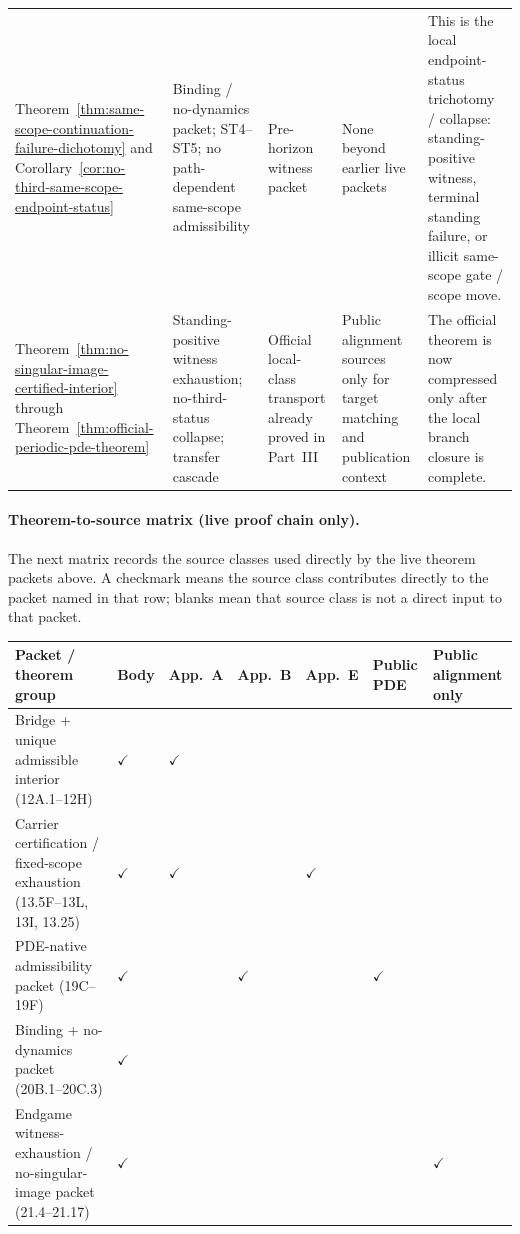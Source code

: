 \begin{center}
\begin{tabularx}{0.98\textwidth}{@{}L{0.22\textwidth}L{0.17\textwidth}L{0.17\textwidth}L{0.16\textwidth}Y@{}}
Theorem~\ref{thm:same-scope-continuation-failure-dichotomy} and Corollary~\ref{cor:no-third-same-scope-endpoint-status} & Binding / no-dynamics packet; ST4--ST5; no path-dependent same-scope admissibility & Pre-horizon witness packet & None beyond earlier live packets & This is the local endpoint-status trichotomy / collapse: standing-positive witness, terminal standing failure, or illicit same-scope gate / scope move.\\
Theorem~\ref{thm:no-singular-image-certified-interior} through Theorem~\ref{thm:official-periodic-pde-theorem} & Standing-positive witness exhaustion; no-third-status collapse; transfer cascade & Official local-class transport already proved in Part~III & Public alignment sources only for target matching and publication context & The official theorem is now compressed only after the local branch closure is complete.\\
\bottomrule
\end{tabularx}
\end{center}

\paragraph{Theorem-to-source matrix (live proof chain only).}
The next matrix records the source classes used directly by the live theorem packets above. A checkmark means the source class contributes directly to the packet named in that row; blanks mean that source class is not a direct input to that packet.

\begin{center}
\footnotesize
\renewcommand{\arraystretch}{1.12}
\setlength{\tabcolsep}{4pt}
\begin{tabularx}{0.98\textwidth}{@{}L{0.26\textwidth}L{0.08\textwidth}L{0.08\textwidth}L{0.08\textwidth}L{0.12\textwidth}L{0.12\textwidth}Y@{}}
\toprule
\textbf{Packet / theorem group} & \textbf{Body} & \textbf{App.~A} & \textbf{App.~B} & \textbf{App.~E} & \textbf{Public PDE} & \textbf{Public alignment only}\\
\midrule
Bridge + unique admissible interior (12A.1--12H) & $\checkmark$ & $\checkmark$ &  &  &  &  \\
Carrier certification / fixed-scope exhaustion (13.5F--13L, 13I, 13.25) & $\checkmark$ & $\checkmark$ &  & $\checkmark$ &  &  \\
PDE-native admissibility packet (19C--19F) & $\checkmark$ &  & $\checkmark$ &  & $\checkmark$ &  \\
Binding + no-dynamics packet (20B.1--20C.3) & $\checkmark$ &  &  &  &  &  \\
Endgame witness-exhaustion / no-singular-image packet (21.4--21.17) & $\checkmark$ &  &  &  &  & $\checkmark$ \\
\bottomrule
\end{tabularx}
\end{center}

